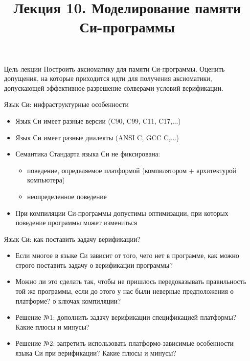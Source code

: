 \documentclass[hyperref={unicode=true}]{beamer}
\title{Лекция 10. Моделирование памяти Си-программы}
\author{}
\date{}
\begin{document}
	\begin{frame}{}
		\titlepage
	\end{frame}

    \begin{frame}{Цель лекции}
    Построить аксиоматику для памяти Си-программы.
    Оценить допущения, на которые приходится идти
    для получения аксиоматики, допускающей
    эффективное разрешение солверами условий верификации.
    \end{frame}

    \begin{frame}{Язык Си: инфраструктурные особенности}
    \begin{itemize}
    \item
    Язык Си имеет разные версии (C90, C99, C11, C17,...)
    \item
    Язык Си имеет разные диалекты (ANSI C, GCC C,...)
    \item
    Семантика Стандарта языка Си не фиксирована:
        \begin{itemize}
        \item поведение, определяемое платформой (компилятором
        + архитектурой компьютера)
        \item неопределенное поведение
        \end{itemize}
    \item
    При компиляции Си-программы допустимы оптимизации, при
    которых поведение программы может измениться
    \end{itemize}
    \end{frame}

    \begin{frame}{Язык Си: как поставить задачу верификации?}
    \begin{itemize}
    \item
    Если многое в языке Си зависит от того, чего нет в программе,
    как можно строго поставить задачу о верификации программы?
    \item
    Можно ли это сделать так, чтобы не пришлось передоказывать
    правильность той же программы, если до этого у нас были
    неверные предположения о платформе? о ключах компиляции?
    \item
    Решение №1: дополнить задачу верификации спецификацией
    платформы? Какие плюсы и минусы?
    \item
    Решение №2: запретить использовать платформо-зависимые
    особенности языка Си при верификации? Какие плюсы и минусы?
    \end{itemize}
    \end{frame}
\end{document}
